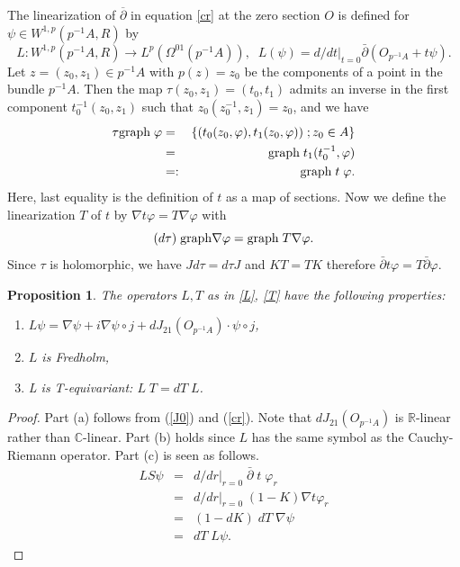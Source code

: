 \documentclass{amsart}
\newcommand{\be}{\begin{equation}}
\newcommand{\ee}{\end{equation}}
\newcommand{\bean}{\begin{eqnarray*}}
\newcommand{\eean}{\end{eqnarray*}}
\newtheorem{proposition}[theorem]{Proposition}
\begin{document}
The linearization of  $\overline \partial$ in equation \eqref{cr} at the zero section $O$ is defined for  $\psi \in W^{1,p}(p^{-1}A,R)$ by
\be \label{L}
L:W^{1,p}(p^{-1}A,R)\to L^p(\Omega^{01}(p^{-1}A)), \;\;
L(\psi)=d/dt|_{t=0} \bar{\partial}(O_{p^{-1}A} + t\psi). 
\ee
Let $z=(z_0, z_1) \in p^{-1}A$ with $p(z) = z_0$ be the components of a point in the bundle $p^{-1}A$. Then the map
$\tau (z_0, z_1)=(t_0, t_1)$ admits an inverse in the first component $t_0^{-1}(z_0, z_1)$ such that  
$z_0(z_0^{-1}, z_1)=z_0$, and we have 
\bean
 \tau {\rm graph}\; \varphi 
&=& \{ (t_0(z_0, \varphi), t_1(z_0, \varphi))  \; ; z_0 \in A \} \\
&=& {\rm graph}\; t_1 (t_0^{-1},\varphi )\\
&=:& {\rm  graph} \; t \;\varphi.
\eean
Here, last equality is the definition of $t$ as a map of sections.
Now we define the linearization $T$  of $t$ by $\nabla t \varphi=T \nabla \varphi$ with
\be \label{T}
(d  \tau)\; {\rm graph}\nabla \varphi={\rm graph}\; T \nabla \varphi.
\ee
Since $\tau$ is holomorphic, we have $J d \tau=d \tau J $  and $K T= T K$ therefore $\bar{\partial} t\varphi=T \bar{\partial}\varphi$.
\\
\begin{proposition} \label{p:lin}
The operators $L, T$ as in \eqref{L}, \eqref{T} have the following properties:
\begin{enumerate}\item[(a)] $L\psi=\nabla\psi+i
\nabla\psi\circ j + dJ_{21}(O_{p^{-1}A})\cdot \psi \circ j$,
\item[(b)] $L$ is Fredholm,
\item[(c)] L is T-equivariant: $ L\; T =dT\; L$. \end{enumerate} 
\end{proposition}
\begin{proof}
    Part (a) follows from (\ref{J0}) and (\ref{cr}). Note that $dJ_{21}(O_{p^{-1}A})$ is ${\mathbb{R}}$-linear rather than ${\mathbb{C}}$-linear. Part (b) holds since $L$ has the same symbol as the Cauchy-Riemann operator. Part (c) is seen as follows. 
\bean 
L S \psi &=&  d/dr|_{r=0} \;\bar{\partial}\; t \;\varphi_r \\
&=&  d/dr|_{r=0} \; (1-K) \nabla t \varphi_r \\
&=&  (1-d K) \; d T  \;\nabla \psi \\
&=&  d T\; L \psi.
\eean
\end{proof}
\end{document}
